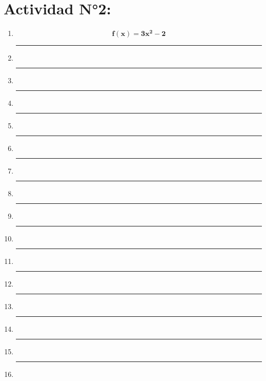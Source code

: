 \documentclass[12pt]{article}
\begin{document}
    \section*{Actividad N°2:}
        \vspace{0.5cm}
        \begin{enumerate}[label=\textbf{\arabic*)}] 
            \hrule\item \[\bm{f(x) = 3x^2 - 2}\]
            \hrule\item \[\bm{}\]
            \hrule\item \[\bm{}\]
            \hrule\item \[\bm{}\]
            \hrule\item \[\bm{}\]
            \hrule\item \[\bm{}\]
            \hrule\item \[\bm{}\]
            \hrule\item \[\bm{}\]
            \hrule\item \[\bm{}\]
            \hrule\item \[\bm{}\]
            \hrule\item \[\bm{}\]
            \hrule\item \[\bm{}\]
            \hrule\item \[\bm{}\]
            \hrule\item \[\bm{}\]
            \hrule\item \[\bm{}\]
            \hrule\item \[\bm{}\]
        \end{enumerate}
\end{document}
